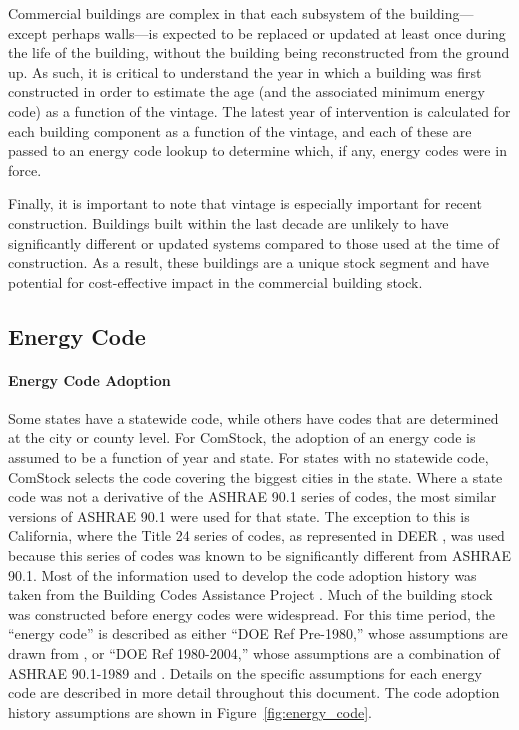 Commercial buildings are complex in that each subsystem of the building---except perhaps walls---is expected to be replaced or updated at least once during the life of the building, without the building being reconstructed from the ground up. As such, it is critical to understand the year in which a building was first constructed in order to estimate the age (and the associated minimum energy code) as a function of the vintage. The latest year of intervention is calculated for each building component as a function of the vintage, and each of these are passed to an energy code lookup to determine which, if any, energy codes were in force.

Finally, it is important to note that vintage is especially important for recent construction. Buildings built within the last decade are unlikely to have significantly different or updated systems compared to those used at the time of construction. As a result, these buildings are a unique stock segment and have potential for cost-effective impact in the commercial building stock.

\subsection{Energy Code} %
\label{sec:energy_code}

\paragraph{Energy Code Adoption}
Some states have a statewide code, while others have codes that are determined at the city or county level. For ComStock, the adoption of an energy code is assumed to be a function of year and state. For states with no statewide code, ComStock selects the code covering the biggest cities in the state. Where a state code was not a derivative of the ASHRAE 90.1 series of codes, the most similar versions of ASHRAE 90.1 were used for that state. The exception to this is California, where the Title 24 series of codes, as represented in DEER \citep{cpuc_deer}, was used because this series of codes was known to be significantly different from ASHRAE 90.1. Most of the information used to develop the code adoption history was taken from the Building Codes Assistance Project \citep{building_codes_assistance}. Much of the building stock was constructed before energy codes were widespread. For this time period, the ``energy code'' is described as either ``DOE Ref Pre-1980,'' whose assumptions are drawn from \cite{doe_reference_buildings}, or ``DOE Ref 1980-2004,'' whose assumptions are a combination of ASHRAE 90.1-1989 and \cite{doe_reference_buildings}. Details on the specific assumptions for each energy code are described in more detail throughout this document. The code adoption history assumptions are shown in Figure~\ref{fig:energy_code}.

